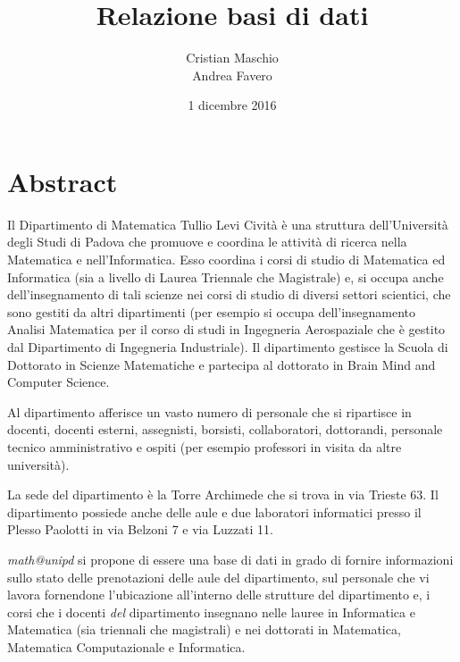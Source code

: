 \documentclass[10pt, a4paper, openany]{book}
\begin{document}
\title{Relazione basi di dati}
\author{Cristian Maschio\\Andrea Favero}
\date{1 dicembre 2016}
\maketitle

\tableofcontents

\chapter{Abstract}
Il Dipartimento di Matematica Tullio Levi Cività è una struttura dell'Università degli Studi di Padova
che promuove e coordina le attività di ricerca nella Matematica e nell'Informatica. Esso coordina i
corsi di studio di Matematica ed Informatica (sia a livello di Laurea Triennale che Magistrale) e,
si occupa anche dell'insegnamento di tali scienze nei corsi di studio di diversi settori scientici, che
sono gestiti da altri dipartimenti (per esempio si occupa dell'insegnamento 
Analisi Matematica per il corso di studi in Ingegneria Aerospaziale che è gestito dal Dipartimento di Ingegneria Industriale).
Il dipartimento gestisce la Scuola di Dottorato in Scienze Matematiche e partecipa al dottorato in
Brain Mind and Computer Science. 

Al dipartimento afferisce un vasto numero di personale che si ripartisce in docenti, docenti esterni,
assegnisti, borsisti, collaboratori, dottorandi, personale tecnico amministrativo e ospiti (per esempio
professori in visita da altre università).

La sede del dipartimento è la Torre Archimede che si trova in via Trieste 63. Il dipartimento possiede
anche delle aule e due laboratori informatici presso il Plesso Paolotti in via Belzoni 7 e via Luzzati
11.

\emph{math@unipd} si propone di essere una base di dati in grado di fornire informazioni sullo stato
delle prenotazioni delle aule del dipartimento, sul personale che vi lavora fornendone l'ubicazione
all'interno delle strutture del dipartimento e, i corsi che i docenti \emph{del} dipartimento insegnano nelle lauree in Informatica e Matematica (sia triennali che  magistrali) e nei dottorati in Matematica,
Matematica Computazionale e Informatica. 
\end{document}
